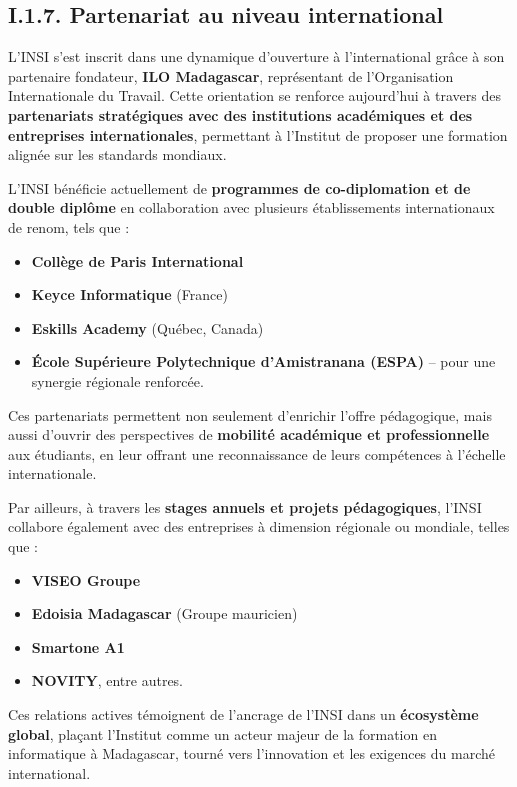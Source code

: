 \subsection{I.1.7. Partenariat au niveau international}

L'INSI s'est inscrit dans une dynamique d'ouverture à l'international grâce à son partenaire fondateur, \textbf{ILO Madagascar}, représentant de l'Organisation Internationale du Travail. Cette orientation se renforce aujourd'hui à travers des \textbf{partenariats stratégiques avec des institutions académiques et des entreprises internationales}, permettant à l'Institut de proposer une formation alignée sur les standards mondiaux.

L'INSI bénéficie actuellement de \textbf{programmes de co-diplomation et de double diplôme} en collaboration avec plusieurs établissements internationaux de renom, tels que :

\begin{itemize}
    \item \textbf{Collège de Paris International}
    \item \textbf{Keyce Informatique} (France)
    \item \textbf{Eskills Academy} (Québec, Canada)
    \item \textbf{École Supérieure Polytechnique d'Amistranana (ESPA)} -- pour une synergie régionale renforcée.
\end{itemize}

Ces partenariats permettent non seulement d'enrichir l'offre pédagogique, mais aussi d'ouvrir des perspectives de \textbf{mobilité académique et professionnelle} aux étudiants, en leur offrant une reconnaissance de leurs compétences à l'échelle internationale.

Par ailleurs, à travers les \textbf{stages annuels et projets pédagogiques}, l'INSI collabore également avec des entreprises à dimension régionale ou mondiale, telles que :

\begin{itemize}
    \item \textbf{VISEO Groupe}
    \item \textbf{Edoisia Madagascar} (Groupe mauricien)
    \item \textbf{Smartone A1}
    \item \textbf{NOVITY}, entre autres.
\end{itemize}

Ces relations actives témoignent de l'ancrage de l'INSI dans un \textbf{écosystème global}, plaçant l'Institut comme un acteur majeur de la formation en informatique à Madagascar, tourné vers l'innovation et les exigences du marché international.

